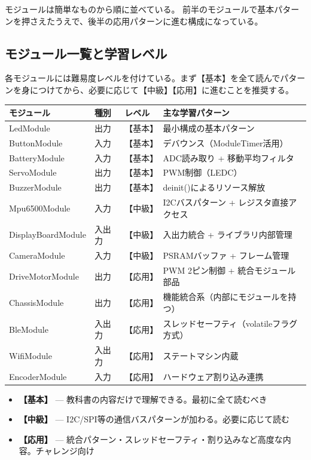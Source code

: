 モジュールは簡単なものから順に並べている。
前半のモジュールで基本パターンを押さえたうえで、後半の応用パターンに進む構成になっている。

\subsection{モジュール一覧と学習レベル}

各モジュールには難易度レベルを付けている。まず【基本】を全て読んでパターンを身につけてから、必要に応じて【中級】【応用】に進むことを推奨する。

\begin{longtable}{l l l l}
\toprule
\textbf{モジュール} & \textbf{種別} & \textbf{レベル} & \textbf{主な学習パターン} \\
\midrule
\endhead
LedModule & 出力 & 【基本】 & 最小構成の基本パターン \\
ButtonModule & 入力 & 【基本】 & デバウンス（ModuleTimer活用） \\
BatteryModule & 入力 & 【基本】 & ADC読み取り + 移動平均フィルタ \\
ServoModule & 出力 & 【基本】 & PWM制御（LEDC） \\
BuzzerModule & 出力 & 【基本】 & deinit()によるリソース解放 \\
\midrule
Mpu6500Module & 入力 & 【中級】 & I2Cバスパターン + レジスタ直接アクセス \\
DisplayBoardModule & 入出力 & 【中級】 & 入出力統合 + ライブラリ内部管理 \\
CameraModule & 入力 & 【中級】 & PSRAMバッファ + フレーム管理 \\
\midrule
DriveMotorModule & 出力 & 【応用】 & PWM 2ピン制御 + 統合モジュール部品 \\
ChassisModule & 出力 & 【応用】 & 機能統合系（内部にモジュールを持つ） \\
BleModule & 入出力 & 【応用】 & スレッドセーフティ（volatileフラグ方式） \\
WifiModule & 入出力 & 【応用】 & ステートマシン内蔵 \\
EncoderModule & 入力 & 【応用】 & ハードウェア割り込み連携 \\
\bottomrule
\end{longtable}

\begin{notebox}[レベルの目安]
\begin{itemize}
    \item \textbf{【基本】} — 教科書の内容だけで理解できる。最初に全て読むべき
    \item \textbf{【中級】} — I2C/SPI等の通信バスパターンが加わる。必要に応じて読む
    \item \textbf{【応用】} — 統合パターン・スレッドセーフティ・割り込みなど高度な内容。チャレンジ向け
\end{itemize}
\end{notebox}
